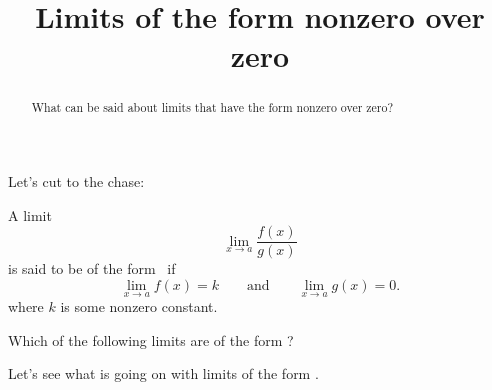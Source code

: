 \documentclass{ximera}
\title[Dig-In:]{Limits of the form nonzero over zero}
\begin{document}
\begin{abstract}
  What can be said about limits that have the form nonzero over zero?
\end{abstract}

\maketitle

Let's cut to the chase:

\begin{definition}
  A limit
  \[
  \lim_{x\to a} \frac{f(x)}{g(x)}
  \]
  is said to be of the form \numOverZero\ if
  \[
  \lim_{x\to a} f(x) = k\qquad\text{and}\qquad \lim_{x\to a} g(x) =0.
  \]
  where $k$ is some nonzero constant.
\end{definition}

\begin{question}
  Which of the following limits are of the form \numOverZero?
  \begin{selectAll}
  \end{selectAll}
\end{question}

Let's see what is going on with limits of the
form \numOverZero.
\end{document}
